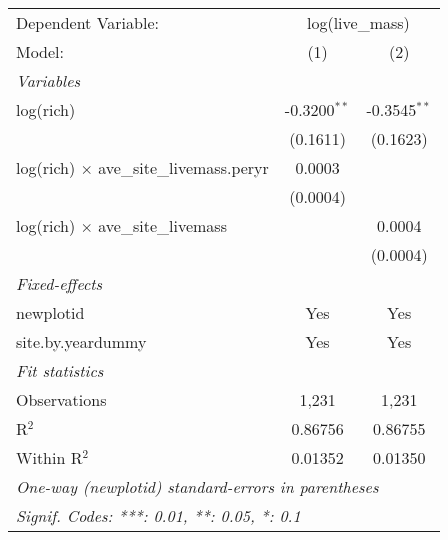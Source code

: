 \begin{tabular}{lcc}
\tabularnewline\midrule\midrule
Dependent Variable:&\multicolumn{2}{c}{log(live\_mass)}\\
Model:&(1) & (2)\\
\midrule \emph{Variables}&   &  \\
log(rich)&-0.3200$^{**}$ & -0.3545$^{**}$\\
  &(0.1611) & (0.1623)\\
log(rich) $\times $ ave\_site\_livemass.peryr&0.0003 &   \\
  &(0.0004) &   \\
log(rich) $\times $ ave\_site\_livemass&   & 0.0004\\
  &   & (0.0004)\\
\midrule \emph{Fixed-effects}&   &  \\
newplotid & Yes & Yes\\
site.by.yeardummy & Yes & Yes\\
\midrule \emph{Fit statistics}&  & \\
Observations & 1,231&1,231\\
R$^2$ & 0.86756&0.86755\\
Within R$^2$ & 0.01352&0.01350\\
\midrule\midrule\multicolumn{3}{l}{\emph{One-way (newplotid) standard-errors in parentheses}}\\
\multicolumn{3}{l}{\emph{Signif. Codes: ***: 0.01, **: 0.05, *: 0.1}}\\
\end{tabular}


